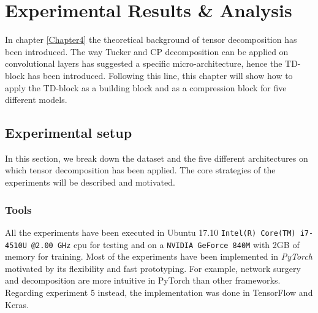 \chapter{Experimental Results \& Analysis} %
\label{Chapter5}
\def \teoria {Figures/teoria}
\def \path	 {Figures/C5}
\def \plots  {Figures/plots}

In chapter \ref{Chapter4} the theoretical background of tensor decomposition has been introduced. The way Tucker and CP decomposition can be applied on convolutional layers has suggested a specific micro-architecture, hence the TD-block has been introduced. Following this line, this chapter will show how to apply the TD-block as a building block and as a compression block for five different models. 


\section{Experimental setup}
In this section, we break down the dataset and the five different architectures on which tensor decomposition has been applied. The core strategies of the experiments will be described and motivated. 


\subsection{Tools}
All the experiments have been executed in Ubuntu 17.10 \texttt{Intel(R) Core(TM) i7-4510U @2.00 GHz} cpu for testing and on a \texttt{NVIDIA GeForce 840M} with 2GB of memory for training. Most of the experiments have been implemented in \emph{PyTorch} \parencite{pytorch} motivated by its flexibility and fast prototyping. For example, network surgery and decomposition are more intuitive in PyTorch than other frameworks. Regarding experiment 5 instead, the implementation was done in TensorFlow\parencite{tensoflow} and Keras\parencite{keras}.  

